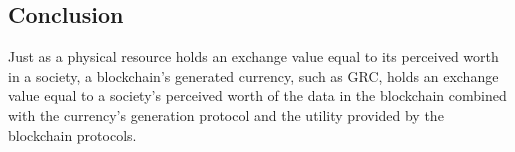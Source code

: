 \subsection{Conclusion}

Just as a physical resource holds an exchange value equal to its perceived worth in a society, a blockchain’s generated currency, such as GRC, holds an exchange value equal to a society's perceived worth of the data in the blockchain combined with the currency’s generation protocol and the utility provided by the blockchain protocols.
